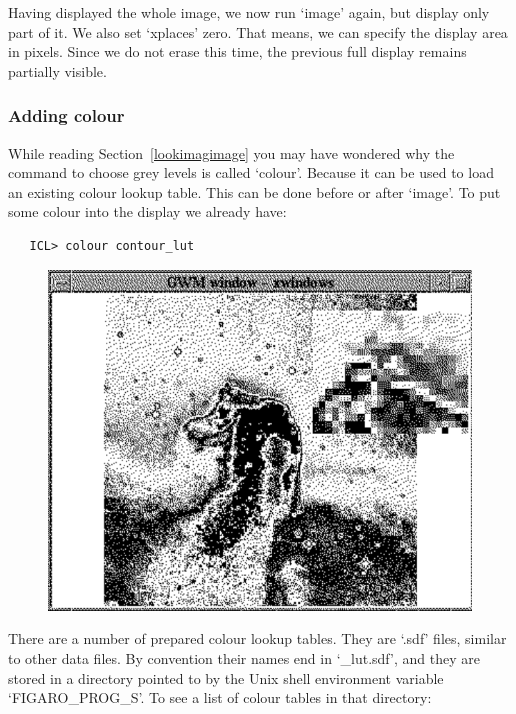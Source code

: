 \documentclass[11pt,twoside]{article}
\newcommand{\htmlref}[2]{#1}
\newcommand{\latorhtm}[2]{#1}
\newcommand{\latorhtm}[2]{#2}
\begin{document}
   Having displayed the whole image, we now run `image' again, but
   display only part of it. We also set `xplaces' zero. That means, we
   can specify the display area in pixels. Since we do not erase this
   time, the previous full display remains partially visible.


\subsubsection{\label{lookimagcolour}Adding colour}

   While reading
   \latorhtm{Section~\ref{lookimagimage}}
   {the section on \htmlref{the image command}{lookimagimage}}
   you may have wondered
   why the command to choose grey levels is called `colour'. Because
   it can be used to load an existing colour lookup table. This can be
   done before or after `image'. To put some colour into the display
   we already have:

\begin{verbatim}
   ICL> colour contour_lut
\end{verbatim}

\begin{figure}[htb]
\begin{center}
\includegraphics{sun86_imag3}
\end{center}
\end{figure}

   There are a number of prepared colour lookup tables. They are
   `.sdf' files, similar to other data files. By convention their
   names end in `\_lut.sdf', and they are stored in a directory pointed
   to by the Unix shell environment variable `FIGARO\_PROG\_S'. To see a
   list of colour tables in that directory:
\end{document}
